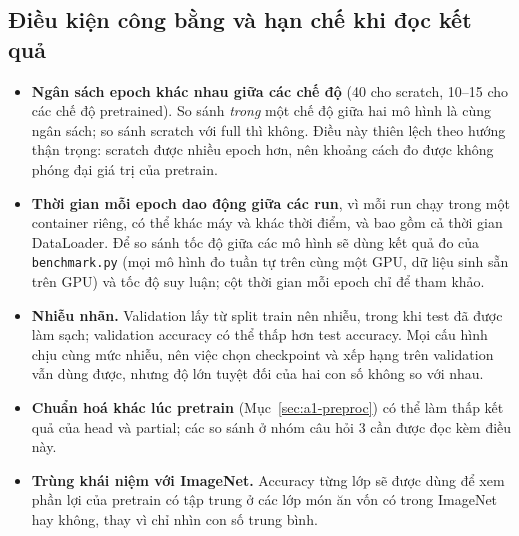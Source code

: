 \subsection{Điều kiện công bằng và hạn chế khi đọc kết quả}
\begin{itemize}
\item \textbf{Ngân sách epoch khác nhau giữa các chế độ} (40 cho scratch, 10--15 cho các chế độ pretrained). So sánh \emph{trong} một chế độ giữa hai mô hình là cùng ngân sách; so sánh scratch với full thì không. Điều này thiên lệch theo hướng thận trọng: scratch được nhiều epoch hơn, nên khoảng cách đo được không phóng đại giá trị của pretrain.
\item \textbf{Thời gian mỗi epoch dao động giữa các run}, vì mỗi run chạy trong một container riêng, có thể khác máy và khác thời điểm, và bao gồm cả thời gian DataLoader. Để so sánh tốc độ giữa các mô hình sẽ dùng kết quả đo của \texttt{benchmark.py} (mọi mô hình đo tuần tự trên cùng một GPU, dữ liệu sinh sẵn trên GPU) và tốc độ suy luận; cột thời gian mỗi epoch chỉ để tham khảo.
\item \textbf{Nhiễu nhãn.} Validation lấy từ split train nên nhiễu, trong khi test đã được làm sạch; validation accuracy có thể thấp hơn test accuracy. Mọi cấu hình chịu cùng mức nhiễu, nên việc chọn checkpoint và xếp hạng trên validation vẫn dùng được, nhưng độ lớn tuyệt đối của hai con số không so với nhau.
\item \textbf{Chuẩn hoá khác lúc pretrain} (Mục~\ref{sec:a1-preproc}) có thể làm thấp kết quả của head và partial; các so sánh ở nhóm câu hỏi 3 cần được đọc kèm điều này.
\item \textbf{Trùng khái niệm với ImageNet.} Accuracy từng lớp sẽ được dùng để xem phần lợi của pretrain có tập trung ở các lớp món ăn vốn có trong ImageNet hay không, thay vì chỉ nhìn con số trung bình.
\end{itemize}

